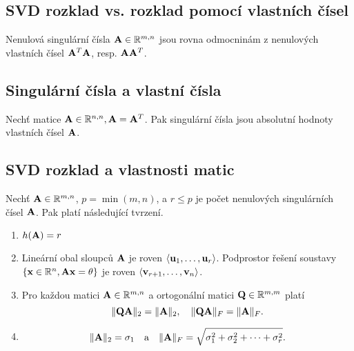 \subsection*{SVD rozklad vs. rozklad pomocí vlastních čísel}

Nenulová singulární čísla $\mathbf{A} \in \mathbb{R}^{m,n}$ jsou rovna odmocninám z nenulových vlastních čísel $\mathbf{A}^T\mathbf{A}$, resp. $\mathbf{A}\mathbf{A}^T$.

\subsection*{Singulární čísla a vlastní čísla}

Nechť matice $\mathbf{A} \in \mathbb{R}^{n,n}, \mathbf{A} = \mathbf{A}^T$. Pak singulární čísla jsou absolutní hodnoty vlastních čísel $\mathbf{A}$.

\subsection*{SVD rozklad a vlastnosti matic}

Nechť $\mathbf{A} \in \mathbb{R}^{m,n}$, $p = \min(m,n)$, a $r \le p$ je počet nenulových singulárních čísel $\mathbf{A}$. Pak platí následující tvrzení.

\begin{enumerate}
	\item $h(\mathbf{A}) = r$
	\item Lineární obal sloupců $\mathbf{A}$ je roven $\langle \mathbf{u}_1,\dots,\mathbf{u}_r\rangle$.
	Podprostor řešení soustavy $\{\mathbf{x} \in \mathbb{R}^n, \mathbf{A} \mathbf{x} = \theta\}$ je roven $\langle \mathbf{v}_{r+1},\dots,\mathbf{v}_{n}\rangle$.
	\item Pro každou matici $\mathbf{A} \in \mathbb{R}^{m,n}$ a ortogonální matici $\mathbf{Q} \in \mathbb{R}^{m,m}$ platí
		\[ \|\mathbf{Q}\mathbf{A}\|_2 = \|\mathbf{A}\|_2, \quad \|\mathbf{Q}\mathbf{A}\|_F = \|\mathbf{A}\|_F. \]
	\item \[ \|\mathbf{A}\|_2 = \sigma_1 \quad \mbox{a} \quad \|\mathbf{A}\|_F = \sqrt{\sigma_1^2 + \sigma_2^2 + \dots + \sigma_r^2}. \]
\end{enumerate}

\pagebreak